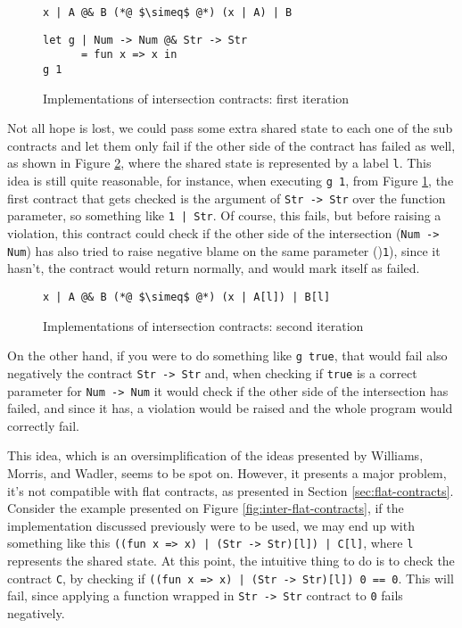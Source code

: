\documentclass[sigplan,10pt,review,anonymous]{acmart}
\newcommand{\nickel}[1]{\lstinline[language=nickel]{#1}}
\begin{document}
\begin{figure}[h]
\begin{lstlisting}[language=nickel, title=Implementation]
x | A @& B (*@ $\simeq$ @*) (x | A) | B
\end{lstlisting}
\begin{lstlisting}[language=nickel, title=Problem]
let g | Num -> Num @& Str -> Str
      = fun x => x in
g 1
\end{lstlisting}
\caption{Implementations of intersection contracts: first iteration}
\label{fig:inter-contracts}
\end{figure}

Not all hope is lost, we could pass some extra shared state
to each one of the sub contracts and let them only fail if the other
side of the contract has failed as well, as shown in Figure
\ref{fig:inter-contracts-2}, where the shared state is
represented by a label \nickel{l}.
This idea is still quite reasonable, for instance, when executing
\nickel{g 1}, from Figure \ref{fig:inter-contracts}, the first contract
that gets checked is the argument of \nickel{Str -> Str} over the function parameter, so
something like \nickel{1 | Str}.
Of course, this fails, but before raising a violation, this contract could
check if the other side of the intersection (\nickel{Num -> Num}) has
also tried to raise negative blame on the same parameter ()\nickel{1}), since
it hasn't, the contract would return normally, and would mark itself as failed.

\begin{figure}[h]
\begin{lstlisting}[language=nickel, title=Implementation]
x | A @& B (*@ $\simeq$ @*) (x | A[l]) | B[l]
\end{lstlisting}
\caption{Implementations of intersection contracts: second iteration}
\label{fig:inter-contracts-2}
\end{figure}

On the other hand, if you were to do something like
\nickel{g true}, that would fail also negatively the contract
\nickel{Str -> Str} and, when checking if \nickel{true}
is a correct parameter for \nickel{Num -> Num} it would check
if the other side of the intersection has failed, and since it
has, a violation would be raised and the whole program would
correctly fail.

This idea, which is an oversimplification of the ideas
presented by Williams, Morris, and Wadler, seems to be spot on.
However, it presents a major problem, it's not compatible with flat contracts,
as presented in Section \ref{sec:flat-contracts}.
Consider the example presented on Figure \ref{fig:inter-flat-contracts}, if the
implementation discussed previously were to be used, we may end up with
something like this \nickel{((fun x => x) | (Str -> Str)[l]) | C[l]}, where
\nickel{l} represents the shared state.
At this point, the intuitive thing to do is to check the contract \nickel{C}, by
checking if \nickel{((fun x => x) | (Str -> Str)[l]) 0 == 0}.  This will fail,
since applying a function wrapped in \nickel{Str -> Str} contract to \nickel{0}
fails negatively.
\end{document}

